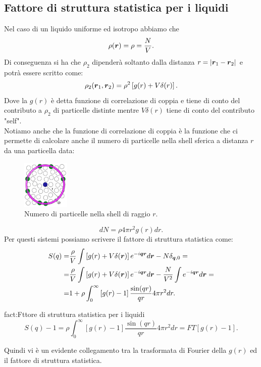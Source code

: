 \subsection{Fattore di struttura statistica per i liquidi}
\label{subsec:Fattore di struttura statistica per i liquidi}
Nel caso di un liquido uniforme ed isotropo abbiamo che 
\[
	\rho (\boldsymbol{r}) = \rho = \frac{N}{V}
.\] 
Di conseguenza si ha che $\rho _2$ dipenderà soltanto dalla distanza $r = \left| \boldsymbol{r}_1 - \boldsymbol{r}_2 \right| $ e potrà essere scritto come:
\[
	\rho _2 (\boldsymbol{r}_1, \boldsymbol{r}_2) 
	=
	\rho ^2\left[ g(r)+V\delta(r) \right] 
.\] 
Dove la $g(r)$ è detta funzione di correlazione di coppia e tiene di conto del contributo a $\rho _2$ di particelle distinte mentre $V\delta(r)$ tiene di conto del contributo "self".\\
Notiamo anche che la funzione di correlazione di coppia è la funzione che ci permette di calcolare anche il numero di particelle nella shell sferica a distanza $r$ da una particella data:
\begin{figure}[H]
	\centering
	\includegraphics[width=0.2\textwidth]{figures/Istantanea_2020-04-04_09-36-23.png}
	\caption{Numero di particelle nella shell di raggio $r$.}
	\label{fig:-figures-Istantanea_2020-04-04_09-36-23-png}
\end{figure}
\[
	dN = \rho 4\pi r^2 g(r)dr
.\] 
Per questi sistemi possiamo scrivere il fattore di struttura statistica come:
\[\begin{aligned}
	S(q) =&
	\frac{\rho }{V} \int \left[ g(r) + V\delta(\boldsymbol{r}) \right] e^{-i \boldsymbol{q}\boldsymbol{r}}d \boldsymbol{r} - N \delta_{\boldsymbol{q},0}=\\
	=&
	\frac{\rho }{V} \int \left[ g(r) + V\delta(\boldsymbol{r}) \right] e^{-i \boldsymbol{q}\boldsymbol{r}}d \boldsymbol{r} - \frac{N}{V^2} \int e^{-i \boldsymbol{q}\boldsymbol{r}}d \boldsymbol{r}=\\
	=&
	1 + \rho \int_{0}^{\infty} \left[ g(r) - 1 \right] \frac{\sin(qr)}{qr}4\pi r^2 dr 
.\end{aligned}\]
\begin{fact}{fact:Fttore di struttura statistica per i liquidi}
	\[
		S(q) - 1 = 
		\rho \int_{0}^{\infty} \left[ g(r) - 1 \right] \frac{\sin(qr)}{qr}4\pi r^2 dr 
		=
		FT\left[ g(r) - 1 \right] 
	.\] 
\end{fact}
Quindi vi è un evidente collegamento tra la trasformata di Fourier della $g(r)$ ed il fattore di struttura statistica.
